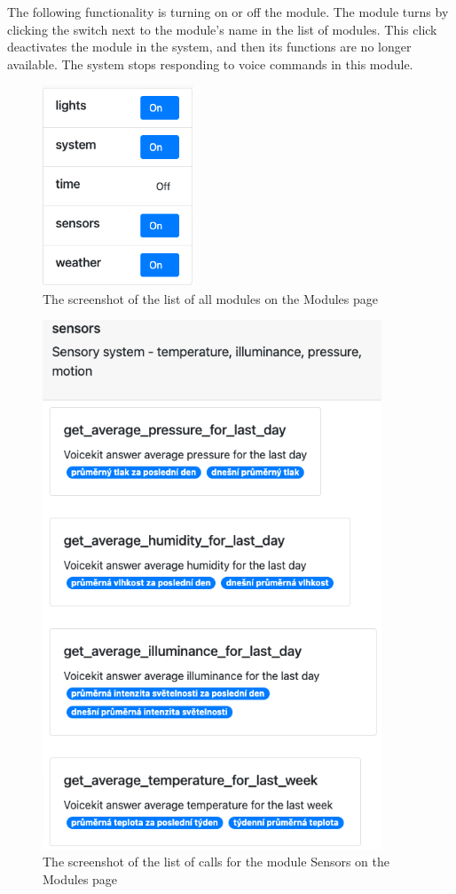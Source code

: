 The following functionality is turning on or off the module. The module turns by clicking the switch next to the module's name in the list of modules. This click deactivates the module in the system, and then its functions are no longer available. The system stops responding to voice commands in this module.

\begin{figure}[H]
    \centering
    \includegraphics[width=0.4\textwidth]{img/screenshot_modules_modules.png}
    \caption{The screenshot of the list of all modules on the Modules page}
    \label{fig:screenshot_modules_modules}
\end{figure}

\begin{figure}[H]
    \centering
    \includegraphics[width=0.9\textwidth]{img/screenshot_modules_calls.png}
    \caption{The screenshot of the list of calls for the module Sensors on the Modules page}
    \label{fig:screenshot_modules_calls}
\end{figure}
